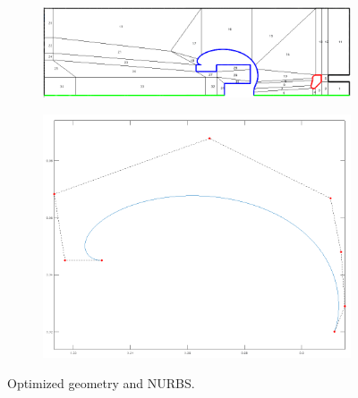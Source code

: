 \begin{center}
\begin{figure}[H]
    \begin{subfigure}{0.45\textwidth}
        \includegraphics[width=\textwidth]{fig/png/geometry_v6_opt_order=8}
    \end{subfigure}
    \begin{subfigure}{0.45\textwidth}
        \includegraphics[width=\textwidth]{fig/png/opt_order=8}
    \end{subfigure}
    \caption{Optimized geometry and NURBS.}
    \label{fig:opt_order=8}
\end{figure}
\end{center}

